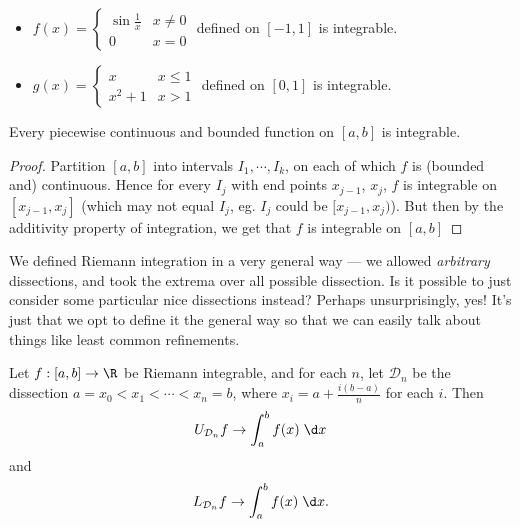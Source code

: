 \documentclass[a4paper]{article}
\begin{document}
\begin{eg}\leavevmode
  \begin{itemize}
    \item $f(x) =
      \begin{cases}
        \sin \frac{1}{x}& x \not = 0\\
        0 & x = 0
      \end{cases}$ defined on $[-1, 1]$ is integrable.
    \item $g(x) =
      \begin{cases}
        x & x \leq 1\\
        x^2 + 1 & x > 1
      \end{cases}$ defined on $[0, 1]$ is integrable.
  \end{itemize}
\end{eg}

\begin{cor}
  Every piecewise continuous and bounded function on $[a, b]$ is integrable.
\end{cor}

\begin{proof}
  Partition $[a, b]$ into intervals $I_1, \cdots, I_k$, on each of which $f$ is (bounded and) continuous. Hence for every $I_j$ with end points $x_{j - 1}$, $x_j$, $f$ is integrable on $[x_{j - 1}, x_j]$ (which may not equal $I_j$, eg. $I_j$ could be $[x_{j - 1}, x_j)$). But then by the additivity property of integration, we get that $f$ is integrable on $[a, b]$
\end{proof}

We defined Riemann integration in a very general way --- we allowed \emph{arbitrary} dissections, and took the extrema over all possible dissection. Is it possible to just consider some particular nice dissections instead? Perhaps unsurprisingly, yes! It's just that we opt to define it the general way so that we can easily talk about things like least common refinements.
\begin{lemma}
  Let $f: [a, b] \to \R$ be Riemann integrable, and for each $n$, let $\mathcal{D}_n$ be the dissection $a = x_0 < x_1 < \cdots < x_n = b$, where $x_i = a + \frac{i(b - a)}{n}$ for each $i$. Then
  \[
    U_{\mathcal{D}_n}f \to \int_a^b f(x)\;\d x
  \]
  and
  \[
    L_{\mathcal{D}_n}f \to \int_a^b f(x)\;\d x.
  \]
\end{lemma}
\end{document}
